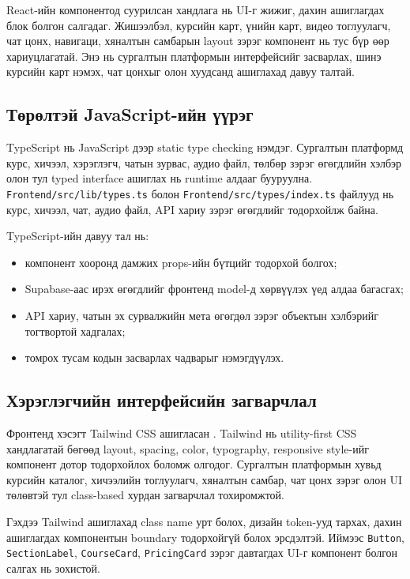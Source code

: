 React-ийн компонентод суурилсан хандлага нь UI-г жижиг, дахин ашиглагдах блок болгон салгадаг. Жишээлбэл, курсийн карт, үнийн карт, видео тоглуулагч, чат цонх, навигаци, хяналтын самбарын layout зэрэг компонент нь тус бүр өөр хариуцлагатай. Энэ нь сургалтын платформын интерфейсийг засварлах, шинэ курсийн карт нэмэх, чат цонхыг олон хуудсанд ашиглахад давуу талтай.

\subsection{Төрөлтэй JavaScript-ийн үүрэг}
TypeScript нь JavaScript дээр static type checking нэмдэг. Сургалтын платформд курс, хичээл, хэрэглэгч, чатын зурвас, аудио файл, төлбөр зэрэг өгөгдлийн хэлбэр олон тул typed interface ашиглах нь runtime алдааг бууруулна. \texttt{Frontend/src/lib/types.ts} болон \texttt{Frontend/src/types/index.ts} файлууд нь курс, хичээл, чат, аудио файл, API хариу зэрэг өгөгдлийг тодорхойлж байна.

TypeScript-ийн давуу тал нь:
\begin{itemize}
  \item компонент хооронд дамжих props-ийн бүтцийг тодорхой болгох;
  \item Supabase-аас ирэх өгөгдлийг фронтенд model-д хөрвүүлэх үед алдаа багасгах;
  \item API хариу, чатын эх сурвалжийн мета өгөгдөл зэрэг объектын хэлбэрийг тогтвортой хадгалах;
  \item томрох тусам кодын засварлах чадварыг нэмэгдүүлэх.
\end{itemize}

\subsection{Хэрэглэгчийн интерфейсийн загварчлал}
Фронтенд хэсэгт Tailwind CSS ашигласан \cite{tailwind_docs}. Tailwind нь utility-first CSS хандлагатай бөгөөд layout, spacing, color, typography, responsive style-ийг компонент дотор тодорхойлох боломж олгодог. Сургалтын платформын хувьд курсийн каталог, хичээлийн тоглуулагч, хяналтын самбар, чат цонх зэрэг олон UI төлөвтэй тул class-based хурдан загварчлал тохиромжтой.

Гэхдээ Tailwind ашиглахад class name урт болох, дизайн token-ууд тархах, дахин ашиглагдах компонентын boundary тодорхойгүй болох эрсдэлтэй. Иймээс \texttt{Button}, \texttt{SectionLabel}, \texttt{CourseCard}, \texttt{PricingCard} зэрэг давтагдах UI-г компонент болгон салгах нь зохистой.

